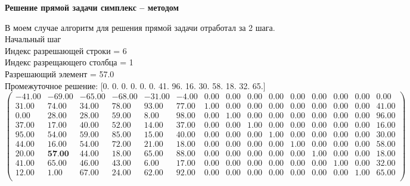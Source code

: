 \documentclass[draft]{article}
\begin{document}
\setcounter{MaxMatrixCols}{21}


\textbf{ Решение прямой задачи симплекс – методом}

\begin{flushleft}
    В моем случае алгоритм для решения прямой задачи отработал за 2 шага.\\
    Начальный шаг\\
    Индекс разрешающей строки = 6\\
    Индекс разрещающего столбца = 1\\
    Разрешающий элемент = 57.0\\
    Промежуточное решение:
    [0.  0.  0.  0.  0.  0.  41.  96.  16.  30.  58.  18.  32.  65.]
\begin{equation*}
\begin{pmatrix}
    -41.00 & -69.00 & -65.00 & -68.00 & -31.00 & -4.00 & 0.00 & 0.00 & 0.00 & 0.00 & 0.00 & 0.00 & 0.00 & 0.00 &  0.00 \\
    31.00 &  74.00 &  34.00 &  78.00 &  93.00 & 77.00 & 1.00 & 0.00 & 0.00 & 0.00 & 0.00 & 0.00 & 0.00 & 0.00 & 41.00 \\
    0.00 &  28.00 &  28.00 &  59.00 &   8.00 & 98.00 & 0.00 & 1.00 & 0.00 & 0.00 & 0.00 & 0.00 & 0.00 & 0.00 & 96.00 \\
    37.00 &  17.00 &  40.00 &  52.00 &  14.00 & 37.00 & 0.00 & 0.00 & 1.00 & 0.00 & 0.00 & 0.00 & 0.00 & 0.00 & 16.00 \\
    95.00 &  54.00 &  59.00 &  85.00 &  15.00 & 40.00 & 0.00 & 0.00 & 0.00 & 1.00 & 0.00 & 0.00 & 0.00 & 0.00 & 30.00 \\
    44.00 &  16.00 &  54.00 &  72.00 &  21.00 & 18.00 & 0.00 & 0.00 & 0.00 & 0.00 & 1.00 & 0.00 & 0.00 & 0.00 & 58.00 \\
    20.00 &  \textbf{57.00} &  44.00 &  18.00 &  65.00 & 88.00 & 0.00 & 0.00 & 0.00 & 0.00 & 0.00 & 1.00 & 0.00 & 0.00 & 18.00 \\
    41.00 &  65.00 &  46.00 &  43.00 &   6.00 & 17.00 & 0.00 & 0.00 & 0.00 & 0.00 & 0.00 & 0.00 & 1.00 & 0.00 & 32.00 \\
    12.00 &   1.00 &  67.00 &  24.00 &  62.00 & 92.00 & 0.00 & 0.00 & 0.00 & 0.00 & 0.00 & 0.00 & 0.00 & 1.00 & 65.00 \\
\end{pmatrix}
\end{equation*}
\end{flushleft}
\end{document}
